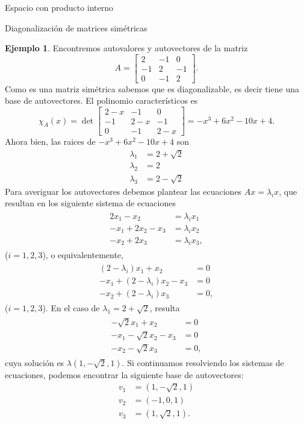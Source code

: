 \documentclass[a4paper,12pt,twoside,spanish]{amsbook}
\theoremstyle{definition}
\newtheorem{ejemplo}{Ejemplo}[section]
\theoremstyle{remark}
\begin{document}
\begin{chapter}{Espacio con producto interno}
\begin{section}{Diagonalización de matrices simétricas}
	\begin{ejemplo} Encontremos autovalores y autovectores de  la matriz
		\begin{equation*}
			A = \begin{bmatrix} 2&-1&0\\-1&2&-1\\0&-1&2 \end{bmatrix}.
		\end{equation*}
		Como es una matriz simétrica sabemos que es diagonalizable, es decir tiene una base de autovectores. 
		El polinomio característicos es
		\begin{equation*}
			\chi_A(x) = \det  \begin{bmatrix} 2-x&-1&0\\-1&2-x&-1\\0&-1&2-x \end{bmatrix} =	-x^3 + 6 x^2 - 10 x + 4.
		\end{equation*}
		Ahora bien, las raices de $-x^3 + 6 x^2 - 10 x + 4 $  son 
		\begin{align*}
			\lambda_1 &= 2 + \sqrt 2 \\
			\lambda_2 &= 2 \\
			\lambda_3 &= 2 - \sqrt 2
		\end{align*}
		Para averiguar los autovectores debemos plantear las ecuaciones $Ax = \lambda_ix$,  que resultan en los siguiente sistema de ecuaciones
		\begin{align*}
		\begin{split}
		2x_1 - x_2  &= \lambda_i x_1 \\
		-x_1 + 2x_2 -x_3 &=\lambda_ix_2 \\
		-x_2 + 2x_3 &= \lambda_ix_3,  
		\end{split}
		\end{align*}
		($i=1,2,3$),  o equivalentemente,
		\begin{align*}
		\begin{split}
		(2 -\lambda_i)x_1+ x_2  &= 0 \\
		-x_1 +(2-\lambda_i)x_2  -x_3 &=0 \\
		-x_2 + (2-\lambda_i)x_3 &= 0,  
		\end{split}
		\end{align*}
		($i=1,2,3$).
		En el caso de $\lambda_1= 2 + \sqrt 2$,  resulta
		\begin{align*}
		\begin{split}
		-\sqrt 2x_1+ x_2  &= 0 \\
		-x_1 -\sqrt 2x_2  -x_3 &=0 \\
		-x_2 -\sqrt 2x_3 &= 0,  
		\end{split}
		\end{align*}
		cuya solución es $\lambda(1, -\sqrt2, 1)$. Si continuamos resolviendo los sistemas de ecuaciones, podemos encontrar la siguiente base de autovectores:
		\begin{align*}
		v_1 &= (1, -\sqrt2, 1) \\		
		v_2 &= (-1, 0, 1) \\		
		v_3 &= (1, \sqrt2, 1).
		\end{align*}
		

\end{ejemplo}
\end{section}
\end{chapter}
\end{document}
